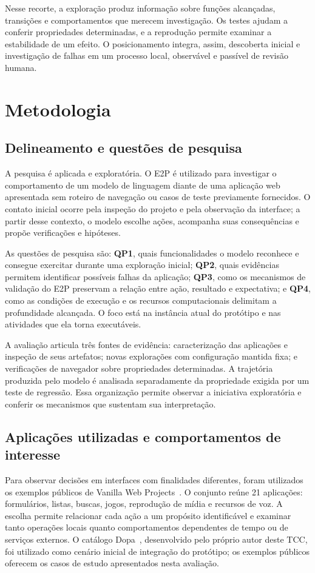 \documentclass[12pt]{article}
\begin{document}
Nesse recorte, a exploração produz informação sobre funções alcançadas, transições e comportamentos que merecem investigação. Os testes ajudam a conferir propriedades determinadas, e a reprodução permite examinar a estabilidade de um efeito. O posicionamento integra, assim, descoberta inicial e investigação de falhas em um processo local, observável e passível de revisão humana.

\section{Metodologia}\label{sec:method}
\subsection{Delineamento e questões de pesquisa}
A pesquisa é aplicada e exploratória. O E2P é utilizado para investigar o comportamento de um modelo de linguagem diante de uma aplicação web apresentada sem roteiro de navegação ou casos de teste previamente fornecidos. O contato inicial ocorre pela inspeção do projeto e pela observação da interface; a partir desse contexto, o modelo escolhe ações, acompanha suas consequências e propõe verificações e hipóteses.

As questões de pesquisa são: \textbf{QP1}, quais funcionalidades o modelo reconhece e consegue exercitar durante uma exploração inicial; \textbf{QP2}, quais evidências permitem identificar possíveis falhas da aplicação; \textbf{QP3}, como os mecanismos de validação do E2P preservam a relação entre ação, resultado e expectativa; e \textbf{QP4}, como as condições de execução e os recursos computacionais delimitam a profundidade alcançada. O foco está na instância atual do protótipo e nas atividades que ela torna executáveis.

A avaliação articula três fontes de evidência: caracterização das aplicações e inspeção de seus artefatos; novas explorações com configuração mantida fixa; e verificações de navegador sobre propriedades determinadas. A trajetória produzida pelo modelo é analisada separadamente da propriedade exigida por um teste de regressão. Essa organização permite observar a iniciativa exploratória e conferir os mecanismos que sustentam sua interpretação.

\subsection{Aplicações utilizadas e comportamentos de interesse}
Para observar decisões em interfaces com finalidades diferentes, foram utilizados os exemplos públicos de Vanilla Web Projects~\cite{traversy2026vanilla}. O conjunto reúne 21 aplicações: formulários, listas, buscas, jogos, reprodução de mídia e recursos de voz. A escolha permite relacionar cada ação a um propósito identificável e examinar tanto operações locais quanto comportamentos dependentes de tempo ou de serviços externos. O catálogo Dopa~\cite{pieceofhell2026dopa}, desenvolvido pelo próprio autor deste TCC, foi utilizado como cenário inicial de integração do protótipo; os exemplos públicos oferecem os casos de estudo apresentados nesta avaliação.
\end{document}
